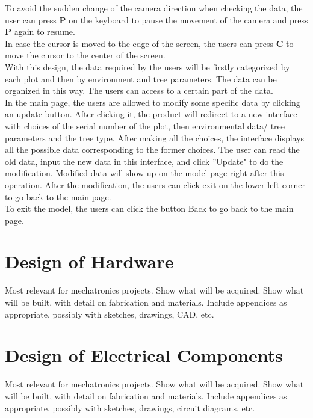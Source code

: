 \documentclass[12pt, titlepage]{article}
\begin{document}
\noindent To avoid the sudden change of the camera direction when checking the data, the user can press \textbf{P} on the keyboard to pause the movement of the camera and press \textbf{P} again to resume. \\

\noindent In case the cursor is moved to the edge of the screen, the users can press \textbf{C} to move the cursor to the center of the screen. \\

\noindent With this design, the data required by the users will be firstly categorized by each plot and then by environment and tree parameters. The data can be organized in this way. The users can access to a certain part of the data. \\

\noindent In the main page, the users are allowed to modify some specific data by clicking an update button. After clicking it, the product will redirect to a new interface with choices of the serial number of the plot, then environmental data/ tree parameters and the tree type. After making all the choices, the interface displays all the possible data corresponding to the former choices. The user can read the old data, input the new data in this interface, and click ''Update" to do the modification. Modified data will show up on the model page right after this operation. After the modification, the users can click exit on the lower left corner to go back to the main page.\\

\noindent To exit the model, the users can click the button Back to go back to the main page. 


\section{Design of Hardware}

Most relevant for mechatronics projects. Show what will be acquired. Show what will be built, with detail on fabrication and materials. Include appendices as appropriate, possibly with sketches, drawings, CAD, etc.

\section{Design of Electrical Components}

Most relevant for mechatronics projects. Show what will be acquired. Show what will be built, with detail on fabrication and materials. Include appendices as appropriate, possibly with sketches, drawings, circuit diagrams, etc.
\end{document}

